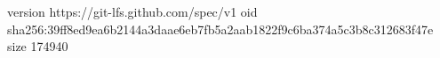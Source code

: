 version https://git-lfs.github.com/spec/v1
oid sha256:39ff8ed9ea6b2144a3daae6eb7fb5a2aab1822f9c6ba374a5c3b8c312683f47e
size 174940
